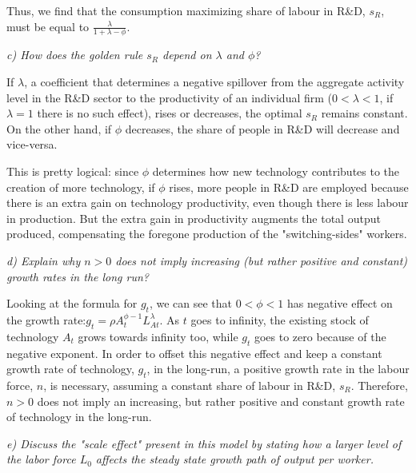 \documentclass[11pt]{article} %
\begin{document}
\par Thus, we find that the consumption maximizing share of labour in R\&D, $s_R$, must be equal to $\frac{\lambda}{1+\lambda-\phi}$.





\pagebreak
\textit{c) How does the golden rule $s_R$ depend on $\lambda$ and $\phi$?}\par 

If $\lambda$, a coefficient that determines a negative spillover from the aggregate activity level in the R\&D sector to the productivity of an individual firm ($0<\lambda<1$, if $\lambda=1$ there is no such effect), rises or decreases, the optimal $s_R$ remains constant. On the other hand, if $\phi$ decreases, the share of people in R\&D will decrease and vice-versa.

\par This is pretty logical: since $\phi$ determines how new technology contributes to the creation of more technology, if $\phi$ rises, more people in R\&D are employed because there is an extra gain on technology productivity, even though there is less labour in production. But the extra gain in productivity augments the total output produced, compensating the foregone production of the "switching-sides" workers.




\bigskip

\bigskip
\textit{d) Explain why $n > 0$ does not imply increasing (but rather positive and constant) growth rates in the long run?}\par

Looking at the formula for $g_t$, we can see that $0 < \phi < 1$ has negative effect on the growth rate:$g_t = \rho A_t^{\phi - 1} L_{At}^{\lambda}$. As $t$ goes to infinity, the existing stock of technology $A_t$ grows towards infinity too, while $g_t$ goes to zero because of the negative exponent. In order to offset this negative effect and keep a constant growth rate of technology, $g_t$, in the long-run, a positive growth rate in the labour force, $n$, is necessary, assuming a constant share of labour in R\&D, $s_R$. Therefore, $n > 0$ does not imply an increasing, but rather positive and constant growth rate of technology in the long-run.






\pagebreak
\textit{e) Discuss the "scale effect" present in this model by stating how a larger level of the labor force $L_0$ affects the steady state growth path of output per worker.}\par
\end{document}
